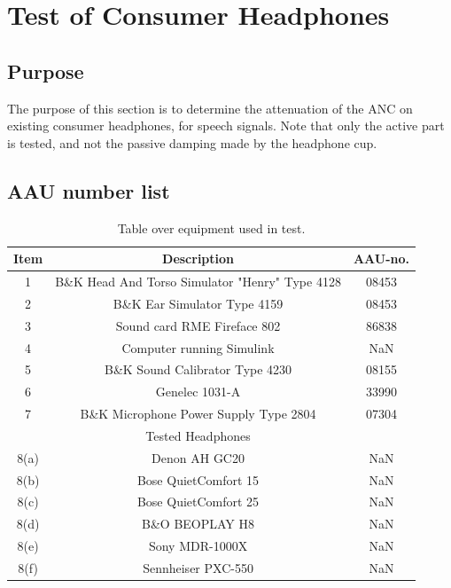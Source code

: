 
\section{Test of Consumer Headphones}
\subsection{Purpose}
The purpose of this section is to determine the attenuation of the ANC on existing consumer headphones, for speech signals. 
Note that only the active part is tested, and not the passive damping made by the headphone cup.


\subsection{AAU number list}
\begin{table}[H]
	\centering
	\begin{tabular}{ c c c } \toprule
	{Item}	&	{Description} 								& {AAU-no}. \\ 
								\bottomrule 
		1	&	B\&K Head And Torso Simulator "Henry" Type 4128	& 08453	\\
		2	&	B\&K Ear Simulator Type 4159				& 08453		\\
		3	&	Sound card RME Fireface 802					& 86838		\\
		4	&	Computer running Simulink					& NaN		\\
		5	&	B\&K Sound Calibrator Type 4230				& 08155		\\ 
		6	&	Genelec 1031-A								& 33990		\\ 
		7	& 	B\&K Microphone Power Supply Type 2804		& 07304		\\
								\bottomrule
							& Tested Headphones 			& 			\\
								\bottomrule
		8(a)	& Denon AH GC20 								& NaN 		\\
		8(b)	& Bose QuietComfort 15 							& NaN 		\\
		8(c)	& Bose QuietComfort 25						 	& NaN		\\
		8(d)	& B\&O BEOPLAY H8 								& NaN		\\
		8(e)	& Sony MDR-1000X 								& NaN		\\
		8(f)	& Sennheiser PXC-550 							& NaN		\\
								\bottomrule
	\end{tabular}
	\caption{Table over equipment used in test.}
	\label{tab:UsedEquipmentListConsumerHP}
\end{table}

